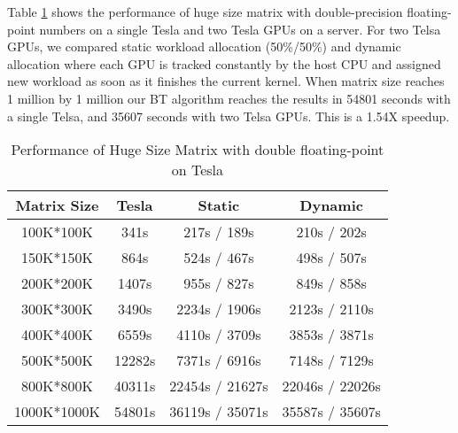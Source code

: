 Table \ref{tab:hugeResultTesla} shows the performance of huge size matrix with double-precision floating-point numbers on a single Tesla and two Tesla GPUs on a server. For two Telsa GPUs, we compared static workload allocation (50\%/50\%) and dynamic allocation where each GPU is tracked constantly by the host CPU and assigned new workload as soon as it finishes the current kernel. 
When matrix size reaches 1 million by 1
million our BT algorithm reaches the results in 54801 seconds
with a single Telsa, and 35607 seconds with two Telsa GPUs. This is a 1.54X speedup.
\begin{table}[h]
\caption{Performance of Huge Size Matrix with double floating-point on Tesla}
\centering
\begin{tabular}{|c|c|c|c|}
\hline
Matrix Size &  Tesla  & Static & Dynamic \\ \hline
 100K*100K  &   341s  &  217s / 189s &  210s / 202s \\ \hline
 150K*150K  &   864s  &  524s / 467s &  498s / 507s \\ \hline
 200K*200K  &  1407s  &  955s / 827s &  849s / 858s \\ \hline
 300K*300K  &  3490s  & 2234s / 1906s & 2123s / 2110s\\ \hline
 400K*400K  &  6559s  & 4110s / 3709s & 3853s / 3871s\\ \hline
 500K*500K  & 12282s  & 7371s / 6916s  & 7148s / 7129s\\ \hline
 800K*800K  & 40311s  & 22454s / 21627s &  22046s / 22026s   \\ \hline
 1000K*1000K & 54801s  & 36119s / 35071s   &  35587s / 35607s \\ \hline
\end{tabular}
\label{tab:hugeResultTesla}
\vspace{-0.15in}
\end{table}


